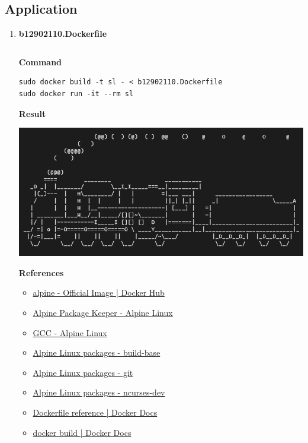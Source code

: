 \documentclass[12pt, a4paper]{article}
\begin{document}
  \subsection*{Application}
  \begin{enumerate}[resume]
    \item
    \textbf{b12902110.Dockerfile}
    \inputminted{docker}{b12902110/b12902110.Dockerfile}

    \textbf{Command}
    \begin{verbatim}
sudo docker build -t sl - < b12902110.Dockerfile
sudo docker run -it --rm sl
    \end{verbatim}

    \textbf{Result}

    \includegraphics[width=0.4\textheight]{13_train.png}

    \textbf{References}
    \begin{itemize}
      \item \href{https://hub.docker.com/_/alpine}{alpine - Official Image | Docker Hub}
      \item \href{https://wiki.alpinelinux.org/wiki/Alpine_Package_Keeper}{Alpine Package Keeper - Alpine Linux}
      \item \href{https://wiki.alpinelinux.org/wiki/GCC}{GCC - Alpine Linux}
      \item \href{https://pkgs.alpinelinux.org/package/edge/main/x86_64/build-base}{Alpine Linux packages - build-base}
      \item \href{https://pkgs.alpinelinux.org/package/edge/main/x86_64/git}{Alpine Linux packages - git}
      \item \href{https://pkgs.alpinelinux.org/package/edge/main/x86_64/ncurses-dev}{Alpine Linux packages - ncurses-dev}
      \item \href{https://docs.docker.com/reference/dockerfile/}{Dockerfile reference | Docker Docs}
      \item \href{https://docs.docker.com/reference/cli/docker/image/build/}{docker build | Docker Docs}
    \end{itemize}


\end{enumerate}
\end{document}
